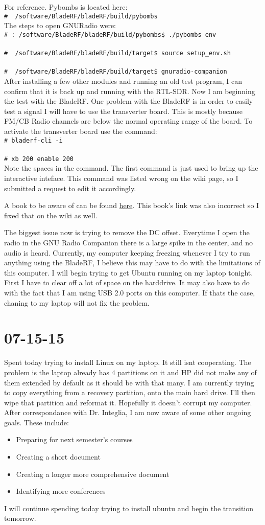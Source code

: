 \documentclass{article}
\newcommand{\shellcmd}[1]{\\\indent\indent\texttt{\footnotesize\# #1}\\}
\begin{document}
	For reference. Pybombs is located here:
	\shellcmd{~/software/BladeRF/bladeRF/build/pybombs}

	The steps to open GNURadio were:
	\shellcmd{:~/software/BladeRF/bladeRF/build/pybombs\$ ./pybombs env}
	\shellcmd{~/software/BladeRF/bladeRF/build/target\$ source setup\_env.sh }
	\shellcmd{~/software/BladeRF/bladeRF/build/target\$ gnuradio-companion} 

	After installing a few other modules and running an old test program, I can confirm that it is back up and running
	with the RTL-SDR. Now I am beginning the test with the BladeRF. One problem with the BladeRF is in order to easily
	test a signal I will have to use the transverter board. This is mostly because FM/CB Radio channels are below
	the normal operating range of the board. To activate the transverter board use the command:
	\shellcmd{bladerf-cli -i}
	\shellcmd{xb 200 enable 200} 
	Note the spaces in the command. The first command is just used to bring up the interactive inteface. This command was
	listed wrong on the wiki page, so I submitted a request to edit it accordingly. 

	A book to be aware of can be found 
	\href{http://people.scs.carleton.ca/~barbeau/SDRCRBook/index.shtml}{here}. This book's link was also incorrect
	so I fixed that on the wiki as well. 
	
	The biggest issue now is trying to remove the DC offset. Everytime I open the radio in the GNU Radio Companion there is a
	large spike in the center, and no audio is heard. Currently, my computer keeping freezing whenever I try to run
	anything using the BladeRF, I believe this may have to do with the limitations of this computer. I will begin trying to
	get Ubuntu running on my laptop tonight. First I have to clear off a lot of space on the harddrive. It may
	also have to do with the fact that I am using USB 2.0 ports on this computer. If thats the case, chaning to my laptop
	will not fix the problem.

	\section{07-15-15}
	Spent today trying to install Linux on my laptop. It still isnt cooperating. The problem is the laptop already has 4 
	partitions on it and HP did not make any of them extended by default as it should be with that many. I am currently
	trying to copy everything from a recovery partition, onto the main hard drive. I'll then wipe that partition and reformat
	it. Hopefully it doesn't corrupt my computer. After correspondance with Dr. Integlia, I am now aware of some other ongoing
	goals. These include:
	\begin{itemize}
	\item Preparing for next semester's courses
	\item Creating a short document
	\item Creating a longer more comprehensive document
	\item Identifying more conferences
	\end{itemize}
	I will continue spending today trying to install ubuntu and begin the transition tomorrow.
\end{document}
